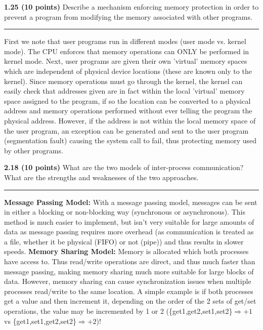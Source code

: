 \documentclass[12pt]{jhwhw}
\begin{document}
\bigbreak
\textbf{1.25 (10 points)} Describe a mechanism enforcing memory protection in order to prevent
a program from modifying the memory associated with other programs.
\textcolor[RGB]{240,240,240}{\rule{\textwidth}{0.5pt}}\bigbreak

	\begin{addmargin}[1em]{}
		First we note that user programs run in different modes (user mode vs. kernel mode).
		The CPU enforces that memory operations can ONLY be performed in kernel mode.
		Next, user programs are given their own 'virtual' memory spaces which are
		independent of physical device locations (these are known only to the kernel).
		Since memory operations must go through the kernel, the kernel can easily check
		that addresses given are in fact within the local 'virtual' memory space assigned
		to the program, if so the location can be converted to a physical address and memory
		operations performed without ever telling the program the physical address. However,
		if the address is not within the local memory space of the user program, an exception
		can be generated and sent to the user program (segmentation fault) causing the
		system call to fail, thus protecting memory used by other programs.
	\end{addmargin}

\bigbreak
\textbf{2.18 (10 points)} What are the two models of inter-process communication? What
are the strengths and weaknesses of the two approaches.
\textcolor[RGB]{240,240,240}{\rule{\textwidth}{0.5pt}}\bigbreak

	\begin{addmargin}[1em]{}
		\textbf{Message Passing Model:} With a message passing model, messages can be sent
			in either a blocking or non-blocking way (synchronous or asynchronous). This
			method is much easier to implement, but isn't very suitable for large 
			amounts of data as message passing requires more overhead (as communication
			is treated as a file, whether it be physical (FIFO) or not (pipe)) and thus
			results in slower speeds.
		\bigbreak
		\textbf{Memory Sharing Model:} Memory is allocated which both processes have access
			to. Thus read/write operations are direct, and thus much faster than message
			passing, making memory sharing much more suitable for large blocks of data.
			However, memory sharing can cause synchronization issues when multiple processes
			read/write to the same location. A simple example is if both processes get a value
			and then increment it, depending on the order of the 2 sets of get/set operations, the
			value may be incremented by 1 or 2 
			(\{get1,get2,set1,set2\}$\Rightarrow+1$ vs \{get1,set1,get2,set2\}$\Rightarrow+2$)!
	\end{addmargin}
\end{document}
